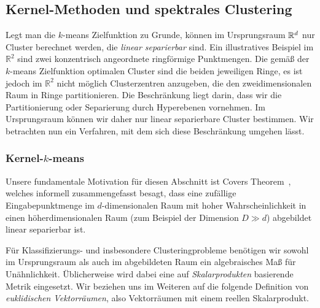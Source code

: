 \subsection{Kernel-Methoden und spektrales Clustering}
\label{subsection:basics:kernel-spectral}

Legt man die $k$-means Zielfunktion zu Grunde, können im Ursprungsraum $\mathbb{R}^{d}$ nur Cluster berechnet werden, die \emph{linear
separierbar} sind. Ein illustratives Beispiel im $\mathbb{R}^2$ sind zwei konzentrisch angeordnete ringförmige Punktmengen.
Die gemäß der $k$-means Zielfunktion optimalen Cluster sind die beiden jeweiligen Ringe, es ist jedoch im $\mathbb{R}^2$ nicht
möglich Clusterzentren anzugeben, die den zweidimensionalen Raum in Ringe partitionieren. Die Beschränkung liegt darin, dass
wir die Partitionierung oder Separierung durch Hyperebenen vornehmen. Im Ursprungsraum können wir daher nur linear separierbare
Cluster bestimmen. Wir betrachten nun ein Verfahren, mit dem sich diese Beschränkung umgehen lässt.

\subsubsection{Kernel-\texorpdfstring{$k$}{k}-means}

Unsere fundamentale Motivation für diesen Abschnitt ist Covers Theorem~\cite{Cover65}, welches informell zusammengefasst besagt,
dass eine zufällige Eingabepunktmenge im $d$-dimensionalen Raum mit hoher Wahrscheinlichkeit in einen höherdimensionalen
Raum (zum Beispiel der Dimension $D \gg d$) abgebildet linear separierbar ist.

Für Klassifizierungs- und insbesondere Clusteringprobleme benötigen wir sowohl im Ursprungsraum als auch im abgebildeten Raum
ein algebraisches Maß für Unähnlichkeit. Üblicherweise wird dabei eine auf \emph{Skalarprodukten} basierende Metrik eingesetzt.
Wir beziehen uns im Weiteren auf die folgende Definition von \emph{euklidischen Vektorräumen}, also Vektorräumen mit einem
reellen Skalarprodukt.

